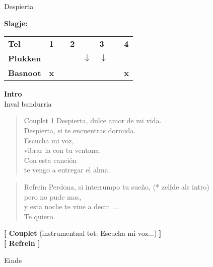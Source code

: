 \begin{song}[tango]{Despierta}

\textbf{Slagje:}

\begin{tabular}{llllllll}
  \textbf{Tel} & \textbf{1} &  & \textbf{2} &  & \textbf{3} &  & \textbf{4} \\
  \textbf{Plukken} &  &  &  & $\downarrow$ & $\downarrow$ &  &  \\
  \textbf{Basnoot} & \textbf{x} &  &  &  &  &  & \textbf{x} \\
\end{tabular}

\textbf{Intro}\\
Inval bandurria
\begin{instrumental}{}
    
\end{instrumental}

\begin{instrumental}{}
\measure{}   
\end{instrumental}{}

\begin{verse}{Couplet 1}
  Despierta, dulce amor de mi vida.
  \\
  Despierta, si te encuentras dormida.
  \\
  Escucha mi voz, \chord{} %
  \\
  vibrar la con tu ventana.
  \\
  Con esta canci\'{o}n \chord{} %
  \\
  te vengo a entregar el alma.
\end{verse}

\begin{verse}{Refrein}
  Perdona, \hspace{4em} si interrumpo tu sue\~{n}o,  \hspace{3em} (* zelfde als intro)
  \\
  pero no pude mas,
  \\
  y esta noche te vine a decir ....
  \\
  Te quiero.
\end{verse}

\textbf{[ Couplet}
(instrumentaal tot: Escucha mi voz...)
\textbf{ ]}\\
\textbf{[ Refrein ]}

\begin{instrumental}{Einde}
\end{instrumental}

\end{song}
